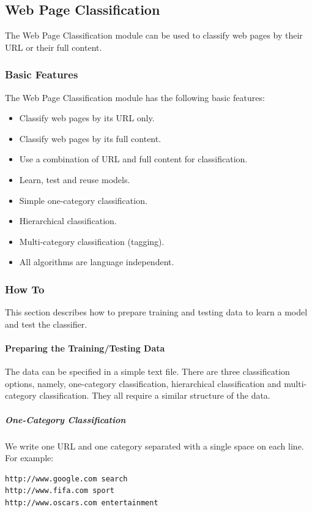 \documentclass[a4paper,twoside]{book}      %
\begin{document}
\subsection{Web Page Classification}
The Web Page Classification module can be used to classify web pages by their URL or their full content.

\subsubsection{Basic Features}
The Web Page Classification module has the following basic features:
\begin{itemize}
\item Classify web pages by its URL only.
\item Classify web pages by its full content.
\item Use a combination of URL and full content for classification.
\item Learn, test and reuse models.
\item Simple one-category classification.
\item Hierarchical classification.
\item Multi-category classification (tagging).
\item All algorithms are language independent.
\end{itemize}

\subsubsection{How To}
This section describes how to prepare training and testing data to learn a model and test the classifier.

\paragraph{Preparing the Training/Testing Data}
The data can be specified in a simple text file. There are three classification options, namely, one-category classification, hierarchical classification and multi-category classification. They all require a similar structure of the data.

\subparagraph{One-Category Classification}
We write one URL and one category separated with a single space on each line. For example:
\begin{verbatim}
http://www.google.com search
http://www.fifa.com sport
http://www.oscars.com entertainment
\end{verbatim}
\end{document}
